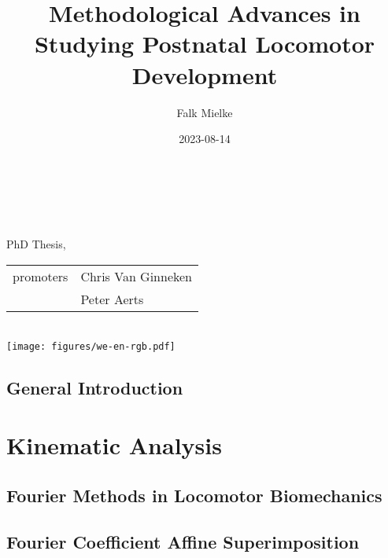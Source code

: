 \documentclass[12pt,a4paper,twoside]{report}
\title{Methodological Advances \linebreak in \linebreak Studying Postnatal Locomotor Development}
\author{Falk Mielke}
\date{2023-08-14}
\newcommand\cleartoleftpage{%
\clearpage
}
\newcommand\cleartorightpage{%
\clearpage
\hbox{}
}
\begin{document}
\doublespacing
\makeatletter
    \begin{titlepage}
    \begin{spacing}{2}
        \begin{center}
        	\ \vspace{3cm}\\
            {\LARGE \bfseries  \@title }\\[6ex] 
            {\large  \@author}\\[8ex] 
            { PhD Thesis, \@date }\\[8ex] 
            \begin{tabular}{r | l}
              promoters & Chris Van Ginneken
               \\ & Peter Aerts
			\end{tabular}\\[12ex]
            {\texttt{[image: figures/we-en-rgb.pdf]}\\[4ex]}
        \end{center}
        \end{spacing}
    \end{titlepage}
\makeatother
\thispagestyle{empty}

\onehalfspacing
\newpage
\setcounter{tocdepth}{1}
\begin{spacing}{1.1}
\tableofcontents
\end{spacing}

\cleartorightpage
\chapter{General Introduction}\label{cpt:generalintro}
\clearpage
% 



\cleartorightpage
\part{Kinematic Analysis}\label{pt:1}
\chapter{Fourier Methods in Locomotor Biomechanics}\label{cpt:fourier_review}
% 

\cleartoleftpage
\chapter{Fourier Coefficient Affine Superimposition}\label{cpt:fcas}
% 
\end{document}
